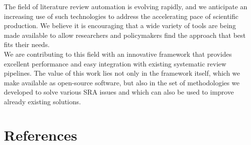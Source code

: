 \documentclass{article}
\begin{document}
The field of literature review automation is evolving rapidly, and we
anticipate an increasing use of such technologies to address the
accelerating pace of scientific production. We believe it is encouraging
that a wide variety of tools are being made available to allow
researchers and policymakers find the approach that best fits their
needs.\\
We are contributing to this field with an innovative framework that
provides excellent performance and easy integration with existing
systematic review pipelines. The value of this work lies not only in the
framework itself, which we make available as open-source software, but
also in the set of methodologies we developed to solve various SRA
issues and which can also be used to improve already existing
solutions.\\

\newpage

\hypertarget{references}{%
\section*{References}\label{references}}
\end{document}
